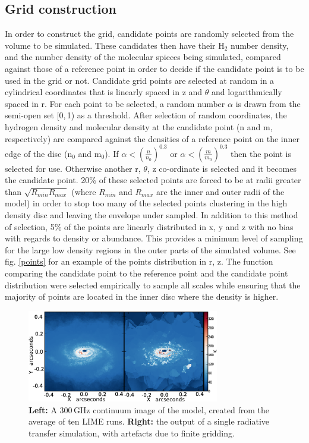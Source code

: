 \documentclass[useAMS,usenatbib]{mn2e}
\begin{document}
\subsection{Grid construction} \label{subsec:gridding}
In order to construct the grid, candidate points are randomly selected from the volume to be simulated. These candidates then have their H$_2$ number density, and the number density of the molecular spieces being simulated, compared against those of a reference point in order to decide if the candidate point is to be used in the grid or not. Candidate grid points are selected at random in a cylindrical coordinates that is linearly spaced in z and $\theta$ and logarithmically spaced in r. For each point to be selected, a random number $\alpha$ is drawn from the semi-open set [0,$\,$1) as a threshold. After selection of random coordinates, the hydrogen density and molecular density at the candidate point (n and m, respectively) are compared against the densities of a reference point on the inner edge of the disc (n$_0$ and m$_0$). If $\alpha<\left( \frac{n}{n_0} \right)^{0.3}$ or $\alpha< \left( \frac{m}{m_0} \right)^{0.3}$ then the point is selected for use. Otherwise another r, $\theta$, z co-ordinate is selected and it becomes the candidate point. 20\% of these selected points are forced to be at radii greater than $\sqrt{R_{min}R_{max}}$ (where $R_{min}$ and $R_{max}$ are the inner and outer radii of the model) in order to stop too many of the selected points clustering in the high density disc and leaving the envelope under sampled. In addition to this method of selection, 5\% of the points are linearly distributed in x, y and z with no bias with regards to density or abundance. This provides a minimum level of sampling for the large low density regions in the outer parts of the simulated volume. See fig. \ref{points} for an example of the points distribution in r, z. The function comparing the candidate point to the reference point and the candidate point distribution were selected empirically to sample all scales while ensuring that the majority of points are located in the inner disc where the density is higher.  \smallskip

\begin{figure}
 \includegraphics[width=84mm]{Figures/sim/continuum2.eps}
 \caption{{\bf Left:} A 300$\,$GHz continuum image of the model, created from the average of ten LIME runs. {\bf Right:} the output of a single radiative transfer simulation, with artefacts due to finite gridding.}
 \label{averages}
\end{figure}
\end{document}
